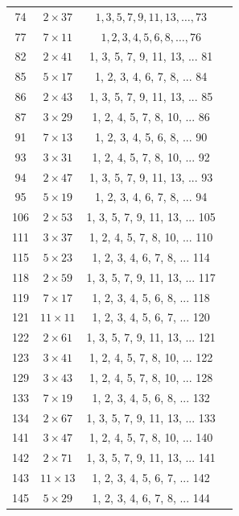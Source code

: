 \documentclass[conference,twoside]{IEEEtran}
\begin{document}
\begin{table}[h]
\begin{tabular}{c c c c}
74 & $2 \times 37$ & $1, 3, 5, 7, 9, 11, 13,\ldots, 73$  \\
77 & $7 \times 11$ & $1, 2, 3, 4, 5, 6, 8, \ldots, 76$  \\
82  & \( 2 \times 41 \)  & 1, 3, 5, 7, 9, 11, 13, ... 81 \\
85  & \( 5 \times 17 \)  & 1, 2, 3, 4, 6, 7, 8, ... 84 \\
86  & \( 2 \times 43 \)  & 1, 3, 5, 7, 9, 11, 13, ... 85 \\
87  & \( 3 \times 29 \)  & 1, 2, 4, 5, 7, 8, 10, ... 86 \\
91  & \( 7 \times 13 \)  & 1, 2, 3, 4, 5, 6, 8, ... 90 \\
93  & \( 3 \times 31 \)  & 1, 2, 4, 5, 7, 8, 10, ... 92 \\
94  & \( 2 \times 47 \)  & 1, 3, 5, 7, 9, 11, 13, ... 93 \\
95  & \( 5 \times 19 \)  & 1, 2, 3, 4, 6, 7, 8, ... 94 \\
106 & \( 2 \times 53 \)  & 1, 3, 5, 7, 9, 11, 13, ... 105 \\
111 & \( 3 \times 37 \)  & 1, 2, 4, 5, 7, 8, 10, ... 110 \\
115 & \( 5 \times 23 \)  & 1, 2, 3, 4, 6, 7, 8, ... 114 \\
118 & \( 2 \times 59 \)  & 1, 3, 5, 7, 9, 11, 13, ... 117 \\
119 & \( 7 \times 17 \)  & 1, 2, 3, 4, 5, 6, 8, ... 118 \\
121 & \( 11 \times 11 \) & 1, 2, 3, 4, 5, 6, 7, ... 120 \\
122 & \( 2 \times 61 \)  & 1, 3, 5, 7, 9, 11, 13, ... 121 \\
123 & \( 3 \times 41 \)  & 1, 2, 4, 5, 7, 8, 10, ... 122 \\
129 & \( 3 \times 43 \)  & 1, 2, 4, 5, 7, 8, 10, ... 128 \\
133 & \( 7 \times 19 \)  & 1, 2, 3, 4, 5, 6, 8, ... 132 \\
134 & \( 2 \times 67 \)  & 1, 3, 5, 7, 9, 11, 13, ... 133 \\
141 & \( 3 \times 47 \)  & 1, 2, 4, 5, 7, 8, 10, ... 140 \\
142 & \( 2 \times 71 \)  & 1, 3, 5, 7, 9, 11, 13, ... 141 \\
143 & \( 11 \times 13 \) & 1, 2, 3, 4, 5, 6, 7, ... 142 \\
145 & \( 5 \times 29 \)  & 1, 2, 3, 4, 6, 7, 8, ... 144 \\
\bottomrule
\end{tabular}
\end{table}
\end{document}
